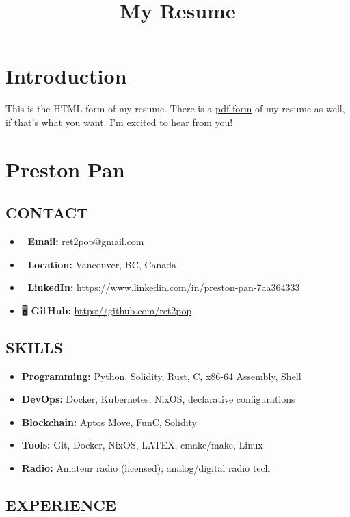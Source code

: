 \documentclass[10pt,letterpaper]{article}
\date{}
\title{My Resume}
\begin{document}
\section*{Introduction}
\label{sec:orgfe25a86}
This is the HTML form of my resume. There is a \href{resume.pdf}{pdf form} of my resume as well, if that's what you want.
I'm excited to hear from you!
\section*{Preston Pan}
\label{sec:org6d476f9}
\begin{minipage}[t]{0.47\textwidth}
\subsection*{CONTACT}
\label{sec:org2a864bf}
\begin{itemize}
\item 📧 \textbf{\textbf{Email:}} ret2pop@gmail.com
\item 📍 \textbf{\textbf{Location:}} Vancouver, BC, Canada
\item 🔗 \textbf{\textbf{LinkedIn:}} \href{https://www.linkedin.com/in/preston-pan-7aa364333}{https://www.linkedin.com/in/preston-pan-7aa364333}
\item 🖥️ \textbf{\textbf{GitHub:}} \href{https://github.com/ret2pop}{https://github.com/ret2pop}
\end{itemize}
\subsection*{SKILLS}
\label{sec:org2892f13}
\begin{itemize}
\item \textbf{\textbf{Programming:}} Python, Solidity, Rust, C, x86-64 Assembly, Shell
\item \textbf{\textbf{DevOps:}} Docker, Kubernetes, NixOS, declarative configurations
\item \textbf{\textbf{Blockchain:}} Aptos Move, FunC, Solidity
\item \textbf{\textbf{Tools:}} Git, Docker, NixOS, LATEX, cmake/make, Linux
\item \textbf{\textbf{Radio:}} Amateur radio (licensed); analog/digital radio tech
\end{itemize}

\vfill
\subsection*{EXPERIENCE}
\label{sec:org6ef9801}

\end{minipage}
\end{document}
